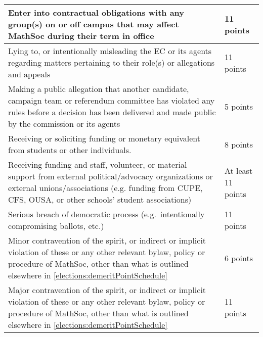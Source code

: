 \begin{center}
\begin{tabular}{| p{11.5cm} | p{4cm} |}
		Enter into contractual obligations with any group(s) on or off campus that may affect MathSoc during their term in office & 11 points \\
		\hline 
		Lying to, or intentionally misleading the EC or its agents regarding matters pertaining to their role(s) or allegations and appeals & 11 points \\
		\hline
		Making a public allegation that another candidate, campaign team or referendum committee has violated any rules before a decision has been delivered and made public by the commission or its agents & 5 points \\
		\hline
		Receiving or soliciting funding or monetary equivalent from students or other individuals. & 8 points \\
		\hline 
		Receiving funding and staff, volunteer, or material support from external political/advocacy organizations or external unions/associations (e.g. funding from CUPE, CFS, OUSA, or other schools’ student associations) & At least 11 points \\
		\hline 
		Serious breach of democratic process (e.g.\ intentionally compromising ballots, etc.) & 11 points \\ 
		\hline
		Minor contravention of the spirit, or indirect or implicit violation of these or any other relevant bylaw, policy or procedure of MathSoc, other than what is outlined elsewhere in \cref{elections:demeritPointSchedule} & 6 points \\
		\hline
		Major contravention of the spirit, or indirect or implicit violation of these or any other relevant bylaw, policy or procedure of MathSoc, other than what is outlined elsewhere in \cref{elections:demeritPointSchedule} & 11 points \\
		\hline
	\end{tabular}
\end{center}



